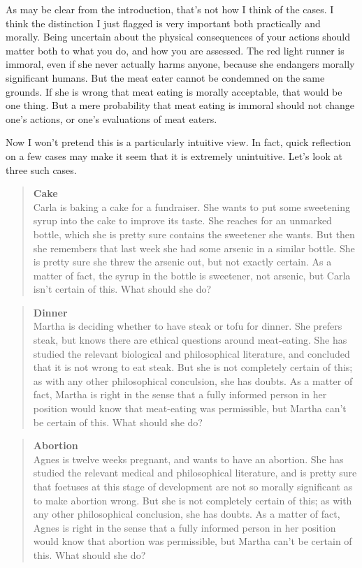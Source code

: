 \documentclass[
  10pt,
  letterpaper,
  DIV=11,
  numbers=noendperiod,
  twoside]{scrartcl}
\begin{document}
As may be clear from the introduction, that's not how I think of the
cases. I think the distinction I just flagged is very important both
practically and morally. Being uncertain about the physical consequences
of your actions should matter both to what you do, and how you are
assessed. The red light runner is immoral, even if she never actually
harms anyone, because she endangers morally significant humans. But the
meat eater cannot be condemned on the same grounds. If she is wrong that
meat eating is morally acceptable, that would be one thing. But a mere
probability that meat eating is immoral should not change one's actions,
or one's evaluations of meat eaters.

Now I won't pretend this is a particularly intuitive view. In fact,
quick reflection on a few cases may make it seem that it is extremely
unintuitive. Let's look at three such cases.

\begin{quote}
\textbf{Cake}\\
Carla is baking a cake for a fundraiser. She wants to put some
sweetening syrup into the cake to improve its taste. She reaches for an
unmarked bottle, which she is pretty sure contains the sweetener she
wants. But then she remembers that last week she had some arsenic in a
similar bottle. She is pretty sure she threw the arsenic out, but not
exactly certain. As a matter of fact, the syrup in the bottle is
sweetener, not arsenic, but Carla isn't certain of this. What should she
do?
\end{quote}

\begin{quote}
\textbf{Dinner}\\
Martha is deciding whether to have steak or tofu for dinner. She prefers
steak, but knows there are ethical questions around meat-eating. She has
studied the relevant biological and philosophical literature, and
concluded that it is not wrong to eat steak. But she is not completely
certain of this; as with any other philosophical conculsion, she has
doubts. As a matter of fact, Martha is right in the sense that a fully
informed person in her position would know that meat-eating was
permissible, but Martha can't be certain of this. What should she do?
\end{quote}

\begin{quote}
\textbf{Abortion}\\
Agnes is twelve weeks pregnant, and wants to have an abortion. She has
studied the relevant medical and philosophical literature, and is pretty
sure that foetuses at this stage of development are not so morally
significant as to make abortion wrong. But she is not completely certain
of this; as with any other philosophical conclusion, she has doubts. As
a matter of fact, Agnes is right in the sense that a fully informed
person in her position would know that abortion was permissible, but
Martha can't be certain of this. What should she do?
\end{quote}
\end{document}
